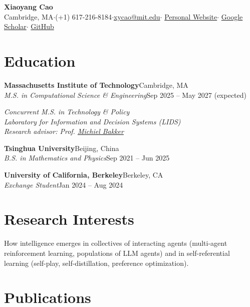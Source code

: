 \documentclass[10pt,letterpaper]{article}
\newcommand{\ulink}[2]{\href{#1}{\underline{#2}}}
\newcommand{\sep}{\enspace$\cdot$\enspace}
\newcommand{\entry}[4]{%
  \textbf{#1}\hfill #2\\
  \textit{#3}\hfill #4\par}
\begin{document}
\begin{center}
  {\LARGE\bfseries Xiaoyang Cao}\\[5pt]
  Cambridge, MA\sep (+1) 617-216-8184\sep \href{mailto:xycao@mit.edu}{xycao@mit.edu}\sep
  \href{https://xiaoyangcao1113.github.io/}{Personal Website}\sep
  \href{https://scholar.google.com/citations?user=XVWuYHAAAAAJ}{Google Scholar}\sep
  \href{https://github.com/XiaoyangCao1113}{GitHub}
\end{center}
\vspace{-6pt}

\section{Education}

\entry{Massachusetts Institute of Technology}{Cambridge, MA}
      {M.S. in Computational Science \& Engineering}{Sep 2025 -- May 2027 (expected)}
\textit{Concurrent M.S. in Technology \& Policy}\\
\textit{Laboratory for Information and Decision Systems (LIDS)}\\
\textit{Research advisor: Prof. \ulink{https://miba.dev/}{Michiel Bakker}}\par
\vspace{6pt}
\entry{Tsinghua University}{Beijing, China}
      {B.S. in Mathematics and Physics}{Sep 2021 -- Jun 2025}
\vspace{6pt}
\entry{University of California, Berkeley}{Berkeley, CA}
      {Exchange Student}{Jan 2024 -- Aug 2024}

\section{Research Interests}

How intelligence emerges in collectives of interacting agents (multi-agent reinforcement learning, populations of
LLM agents) and in self-referential learning (self-play, self-distillation, preference optimization).

\section{Publications}
\end{document}
